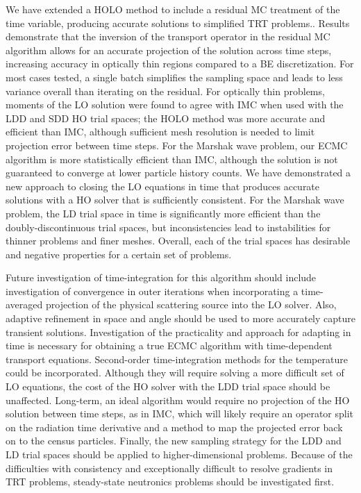 \documentclass{anstrans}
\begin{document}
We have extended a HOLO method to include a residual MC treatment of the time variable, producing
accurate solutions to simplified TRT problems..
Results demonstrate that the inversion of the transport operator in the residual MC algorithm allows
for an accurate projection of the solution across time steps, increasing accuracy in optically thin
regions compared to a BE discretization.  For most cases tested, a single batch simplifies the
sampling space and leads to less variance overall than iterating on the residual.  For optically
thin problems, moments of the LO
solution were found to agree with IMC when used with the LDD and SDD HO trial
spaces; the HOLO method was more accurate and efficient
than IMC, although sufficient mesh resolution is needed to limit projection error between time
steps.  For the Marshak wave problem, our ECMC algorithm is more statistically
efficient than IMC, although the solution is not guaranteed to converge at lower particle history counts.
 We have demonstrated a new approach to closing the LO equations in time that produces
accurate solutions with a HO solver that is sufficiently consistent.  For the Marshak wave problem,
the LD trial space in time is significantly more efficient than the doubly-discontinuous trial
spaces, but inconsistencies lead to instabilities for thinner problems and finer meshes. Overall,
each of the trial spaces has desirable and negative properties for a certain set of problems.

Future investigation of time-integration for this algorithm should include investigation of convergence in outer iterations when
incorporating a time-averaged projection of the physical scattering source into the LO solver.
Also, adaptive refinement in space and angle should be used to more accurately capture transient
solutions.  Investigation of the practicality and approach for adapting in time is necessary for
obtaining a true ECMC algorithm with time-dependent transport equations.
Second-order time-integration methods for the temperature could be incorporated.  Although they will
require solving a more difficult set of LO equations, the cost of the HO solver with the LDD trial
space should be unaffected.
Long-term, an ideal algorithm
would require no projection of the HO solution between time steps, as in IMC, which will likely require an operator split
on the radiation time derivative and a method to map the projected error back on to
the census particles.  Finally, the new sampling strategy for the LDD and LD trial spaces should be
applied to higher-dimensional problems.  Because of the difficulties with consistency and
exceptionally difficult to resolve gradients in TRT problems, steady-state neutronics problems
should be investigated first.
\end{document}
